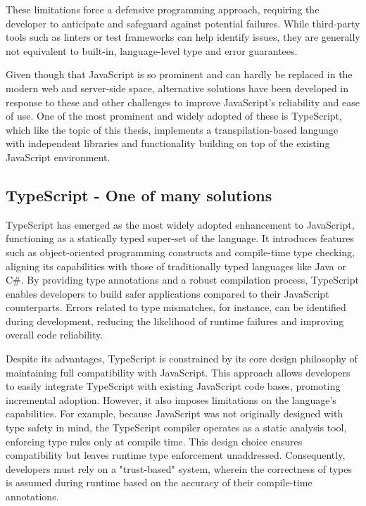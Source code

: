 These limitations force a defensive programming approach, requiring the developer to anticipate and safeguard against potential failures. While third-party tools such as linters or test frameworks can help identify issues, they are generally not equivalent to built-in, language-level type and error guarantees.

Given though that JavaScript is so prominent and can hardly be replaced in the modern web and server-side space, alternative solutions have been developed in response to these and other challenges to improve JavaScript's reliability and ease of use. One of the most prominent and widely adopted of these is TypeScript, which like the topic of this thesis, implements a \gls{transpilation}-based language with independent libraries and functionality building on top of the existing JavaScript environment.

\subsection{TypeScript - One of many solutions}

TypeScript has emerged as the most widely adopted enhancement to JavaScript, functioning as a statically typed super-set of the language. It introduces features such as object-oriented programming constructs and compile-time type checking, aligning its capabilities with those of traditionally typed languages like Java or C\#. By providing type annotations and a robust compilation process, TypeScript enables developers to build safer applications compared to their JavaScript counterparts. Errors related to type mismatches, for instance, can be identified during development, reducing the likelihood of runtime failures and improving overall code reliability.

Despite its advantages, TypeScript is constrained by its core design philosophy of maintaining full compatibility with JavaScript. This approach allows developers to easily integrate TypeScript with existing JavaScript code bases, promoting incremental adoption. However, it also imposes limitations on the language’s capabilities. For example, because JavaScript was not originally designed with type safety in mind, the TypeScript compiler operates as a static analysis tool, enforcing type rules only at compile time. This design choice ensures compatibility but leaves runtime type enforcement unaddressed. Consequently, developers must rely on a "trust-based" system, wherein the correctness of types is assumed during runtime based on the accuracy of their compile-time annotations.

